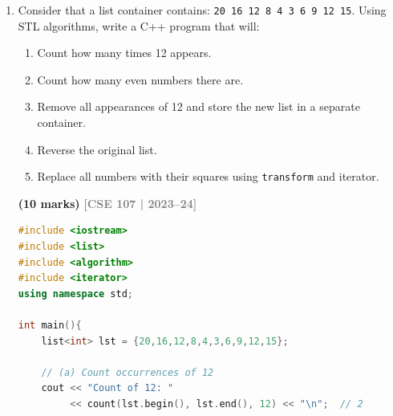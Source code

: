 \documentclass[12pt,a3paper]{article}
\newcommand{\yr}[1]{\hfill\textcolor{gray}{\small\textbf{[#1]}}}
\newcommand{\mk}[1]{\textcolor{orange!70!black}{\small\textbf{(#1 marks)}}}
\begin{document}
\begin{enumerate}
\begin{tcolorbox}[enhanced,breakable,ansbox,colback=cH!4,colframe=cH,
  boxrule=0.8pt,arc=5pt,
  title={\textbf{Answer --- What is STL? Fundamental items.}},
  fonttitle=\bfseries\color{white},colbacktitle=cH]
\begin{enumerate}[label=\textbf{\arabic*.}]
  \item \textbf{Algorithms:} Generic functions that operate on
    containers via iterators: \texttt{sort}, \texttt{find},
    \texttt{count}, \texttt{transform}, \texttt{copy}, etc.

  \item \textbf{Iterators:} Objects that act like pointers,
    providing a uniform way to traverse containers regardless of
    their internal structure (\texttt{begin()}, \texttt{end()},
    \texttt{++}, \texttt{*}).

  \item \textbf{Function Objects (Functors):} Objects that behave
    like functions (overload \texttt{operator()}), used to
    customise algorithm behaviour (e.g.\ comparators, predicates).
\end{enumerate}

\end{tcolorbox}


\item Consider that a list container contains: \texttt{20 16 12 8 4 3 6 9 12 15}. Using STL algorithms, write a C++ program that will:
\begin{enumerate}
  \item Count how many times 12 appears.
  \item Count how many even numbers there are.
  \item Remove all appearances of 12 and store the new list in a separate container.
  \item Reverse the original list.
  \item Replace all numbers with their squares using \texttt{transform} and iterator.
\end{enumerate}
\mk{10}
\yr{CSE 107 | 2023--24}
\begin{tcolorbox}[enhanced,breakable,ansbox,colback=cH!4,colframe=cH,
  boxrule=0.8pt,arc=5pt,
  title={\textbf{Answer --- STL list operations --- count, even, remove, reverse, transform}},
  fonttitle=\bfseries\color{white},colbacktitle=cH]

\begin{lstlisting}[language=C++]
#include <iostream>
#include <list>
#include <algorithm>
#include <iterator>
using namespace std;

int main(){
    list<int> lst = {20,16,12,8,4,3,6,9,12,15};

    // (a) Count occurrences of 12
    cout << "Count of 12: "
         << count(lst.begin(), lst.end(), 12) << "\n";  // 2


\end{lstlisting}
\end{tcolorbox}
\end{enumerate}
\end{document}
